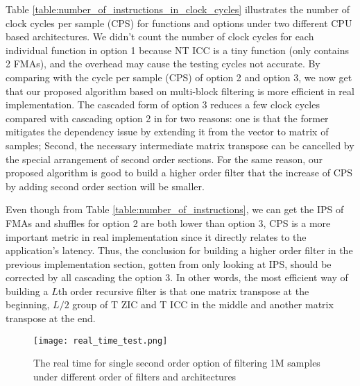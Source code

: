 Table \ref{table:number_of_instructions_in_clock_cycles} illustrates the number of clock cycles per sample (CPS) for functions and options
under two different CPU based architectures. 
We didn't count the number of clock cycles for each individual function in option 1 
because NT ICC is a tiny function (only contains 2 FMAs),
and the overhead may cause the testing cycles not accurate.
By comparing with the cycle per sample (CPS) of option 2 and option 3, we now get that
our proposed algorithm based on multi-block filtering is more efficient in real implementation.
The cascaded form of option 3 reduces a few clock cycles compared with cascading option 2 in \cite{Jaewoo_09}
for two reasons: one is that the former mitigates the dependency issue
by extending it from the vector to matrix of samples; Second, 
the necessary intermediate matrix transpose can be cancelled by the special arrangement of second order sections.  
For the same reason, our proposed algorithm is good to build a higher order filter that 
the increase of CPS by adding second order section will be smaller.

Even though from Table \ref{table:number_of_instructions}, we can get the IPS of FMAs and shuffles for option 2 are both lower than
option 3, CPS is a more important metric in real implementation since it directly relates to the application's latency.
Thus, the conclusion for building a higher order filter in the previous implementation section, gotten from only looking at IPS,
should be corrected by all cascading the option 3. In other words, 
the most efficient way of building 
a $L$th order recursive filter is that one matrix transpose at the beginning, $L/2$ group of T ZIC and T ICC in the middle and another matrix transpose at the end.

\begin{figure}[t]
    \centerline{\texttt{[image: real\_time\_test.png]}}
    \caption{The real time for single second order option of filtering 1M samples under different order of filters and architectures}
    \label{fig:Real_time_test}
  \end{figure}

